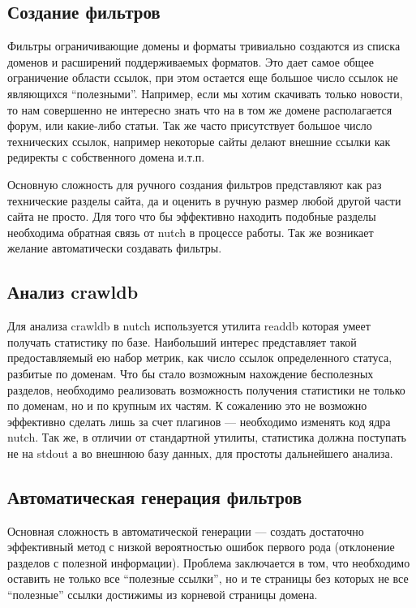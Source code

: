 \subsection{Создание фильтров}
Фильтры ограничивающие домены и форматы тривиально создаются из списка доменов и расширений поддерживаемых форматов. Это дает самое общее ограничение области ссылок, при этом остается еще большое число ссылок не являющихся ``полезными''.
Например, если мы хотим скачивать только новости, то нам совершенно не интересно знать что на в том же домене располагается форум, или какие-либо статьи. Так же часто присутствует большое число технических ссылок, например некоторые сайты делают внешние ссылки как редиректы с собственного домена и.т.п.

Основную сложность для ручного создания фильтров представляют как раз технические разделы сайта, да и оценить в ручную размер любой другой части сайта не просто. Для того что бы эффективно находить подобные разделы необходима обратная связь от nutch в процессе работы. Так же возникает желание автоматически создавать фильтры.

\subsection{Анализ crawldb}
Для анализа crawldb в nutch используется утилита readdb которая умеет получать статистику по базе. Наибольший интерес представляет такой предоставляемый ею набор метрик, как число ссылок определенного статуса, разбитые по доменам. Что бы стало возможным нахождение бесполезных разделов, необходимо реализовать возможность получения статистики не только по доменам, но и по крупным их частям. К сожалению это не возможно эффективно сделать лишь за счет плагинов --- необходимо изменять код ядра nutch. Так же, в отличии от стандартной утилиты, статистика должна поступать не на stdout а во внешнюю базу данных, для простоты дальнейшего анализа.

\subsection{Автоматическая генерация фильтров}
Основная сложность в автоматической генерации --- создать достаточно эффективный метод с низкой вероятностью ошибок первого рода (отклонение разделов с полезной информации). Проблема заключается в том, что необходимо оставить не только все ``полезные ссылки'', но и те страницы без которых не все ``полезные'' ссылки достижимы из корневой страницы домена. 

